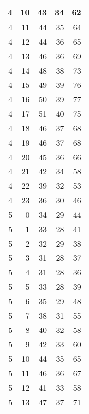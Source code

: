 \begin{longtable}{|r|r|r|r|r|}
    \hline
    4     & 10    & 43    & 34    & 62 \\
    \hline
    4     & 11    & 44    & 35    & 64 \\
    \hline
    4     & 12    & 44    & 36    & 65 \\
    \hline
    4     & 13    & 46    & 36    & 69 \\
    \hline
    4     & 14    & 48    & 38    & 73 \\
    \hline
    4     & 15    & 49    & 39    & 76 \\
    \hline
    4     & 16    & 50    & 39    & 77 \\
    \hline
    4     & 17    & 51    & 40    & 75 \\
    \hline
    4     & 18    & 46    & 37    & 68 \\
    \hline
    4     & 19    & 46    & 37    & 68 \\
    \hline
    4     & 20    & 45    & 36    & 66 \\
    \hline
    4     & 21    & 42    & 34    & 58 \\
    \hline
    4     & 22    & 39    & 32    & 53 \\
    \hline
    4     & 23    & 36    & 30    & 46 \\
    \hline
    5     & 0     & 34    & 29    & 44 \\
    \hline
    5     & 1     & 33    & 28    & 41 \\
    \hline
    5     & 2     & 32    & 29    & 38 \\
    \hline
    5     & 3     & 31    & 28    & 37 \\
    \hline
    5     & 4     & 31    & 28    & 36 \\
    \hline
    5     & 5     & 33    & 28    & 39 \\
    \hline
    5     & 6     & 35    & 29    & 48 \\
    \hline
    5     & 7     & 38    & 31    & 55 \\
    \hline
    5     & 8     & 40    & 32    & 58 \\
    \hline
    5     & 9     & 42    & 33    & 60 \\
    \hline
    5     & 10    & 44    & 35    & 65 \\
    \hline
    5     & 11    & 46    & 36    & 67 \\
    \hline
    5     & 12    & 41    & 33    & 58 \\
    \hline
    5     & 13    & 47    & 37    & 71 \\

\end{longtable}
